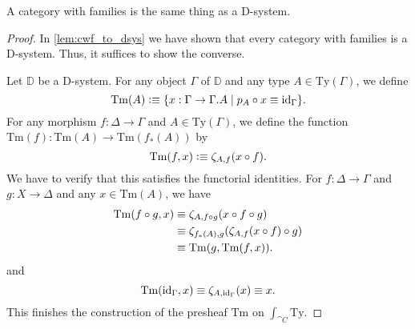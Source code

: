 \begin{thm}
A category with families is the same thing as a D-system.
\end{thm}

\begin{proof}
In \autoref{lem:cwf_to_dsys} we have shown that every category with families is
a D-system. Thus, it suffices to show the converse.

Let $\mathbb{D}$ be a D-system. For any object $\Gamma$ of $\mathbb{D}$ and any
type $A\in\mathrm{Ty}(\Gamma)$, we define 
\begin{equation*}
\mathrm{Tm}(A)\defeq \{ x :\Gamma\to\ctxext{\Gamma}{A}\mid p_A\circ x\jdeq\catid{\Gamma}\}.
\end{equation*}
For any morphism $f:\Delta\to\Gamma$ and $A\in\mathrm{Ty}(\Gamma)$, we define
the function $\mathrm{Tm}(f):\mathrm{Tm}(A)\to\mathrm{Tm}(f_\ast(A))$ by
\begin{equation*}
\mathrm{Tm}(f,x)\vcentcolon\equiv \zeta_{A,f}(x\circ f).
\end{equation*}
We have to verify that this satisfies the functorial identities. For $f:\Delta\to\Gamma$
and $g:X\to\Delta$ and any $x\in\mathrm{Tm}(A)$, we have
\begin{align*}
\mathrm{Tm}(f\circ g,x) & \equiv \zeta_{A,f\circ g}(x\circ f\circ g) \\
& \equiv \zeta_{f_\ast(A),g}(\zeta_{A,f}(x\circ f)\circ g) \\
& \equiv \mathrm{Tm}(g,\mathrm{Tm}(f,x)).
\end{align*}
and
\begin{equation*}
\mathrm{Tm}({\mathrm{id}_{\Gamma}},x) \equiv \zeta_{A,{\mathrm{id}_{\Gamma}}}(x) \equiv x.
\end{equation*}
This finishes the construction of the presheaf $\mathrm{Tm}$ on $\int_{\cat{C}}\mathrm{Ty}$.


\end{proof}

